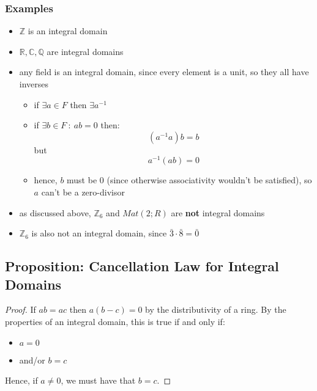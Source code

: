 \documentclass{exam}
\begin{document}
\subsubsection{Examples}

\begin{itemize}
    \item $\mathbb{Z}$ is an integral domain
    \item $\mathbb{R}, \mathbb{C}, \mathbb{Q}$ are integral domains
    \item any field is an integral domain, since every element is a unit, so they all have inverses
    \begin{itemize}
        \item if $\exists a \in F$ then $\exists a^{-1}$
        \item if $\exists b \in F \ : \ ab = 0$ then:
        \[
        (a^{-1}a)b = b
        \]
        but
        \[
        a^{-1}(ab) = 0
        \]
        \item hence, $b$ must be 0 (since otherwise associativity wouldn't be satisfied), so $a$ can't be a zero-divisor
    \end{itemize}
    \item as discussed above, $\mathbb{Z}_6$ and $Mat(2;R)$ are \textbf{not} integral domains
    \item $\mathbb{Z}_6$ is also not an integral domain, since $\bar{3} \cdot \bar{8} = \bar{0}$
\end{itemize}

\subsection{Proposition: Cancellation Law for Integral Domains}


\begin{proof}

If $ab = ac$ then $a(b - c) = 0$ by the distributivity of a ring. By the properties of an integral domain, this is true if and only if:
\begin{itemize}
    \item $a = 0$
    \item and/or $b = c$
\end{itemize}
Hence, if $a \neq 0$, we must have that $b = c$.

\end{proof}
\end{document}
